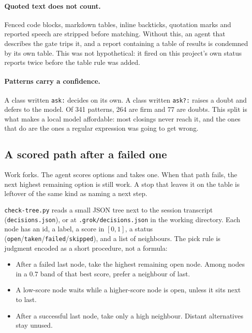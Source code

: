 \paragraph{Quoted text does not count.} Fenced code blocks, markdown tables,
inline backticks, quotation marks and reported speech are stripped before
matching. Without this, an agent that describes the gate trips it, and a report
containing a table of results is condemned by its own table. This was not
hypothetical: it fired on this project's own status reports twice before the
table rule was added.

\paragraph{Patterns carry a confidence.} A class written \texttt{ask:} decides
on its own. A class written \texttt{ask?:} raises a doubt and defers to the
model. Of 341 patterns, 264 are firm and 77 are doubts. This split is what makes
a local model affordable: most closings never reach it, and the ones that do are
the ones a regular expression was going to get wrong.

\subsection{A scored path after a failed one}
\label{sec:tree-system}

Work forks. The agent scores options and takes one. When that path
fails, the next highest remaining option is still work. A stop that
leaves it on the table is leftover of the same kind as naming a next
step.

\texttt{check-tree.py} reads a small JSON tree next to the session
transcript (\texttt{decisions.json}), or at
\texttt{.grok/decisions.json} in the working directory. Each node has
an id, a label, a score in $[0,1]$, a status
(\texttt{open}/\texttt{taken}/\texttt{failed}/\texttt{skipped}), and a
list of neighbours. The pick rule is judgment encoded as a short
procedure, not a formula:

\begin{itemize}
  \item After a failed last node, take the highest remaining open
        node. Among nodes in a $0.7$ band of that best score, prefer a
        neighbour of last.
  \item A low-score node waits while a higher-score node is open,
        unless it sits next to last.
  \item After a successful last node, take only a high neighbour.
        Distant alternatives stay unused.
\end{itemize}


